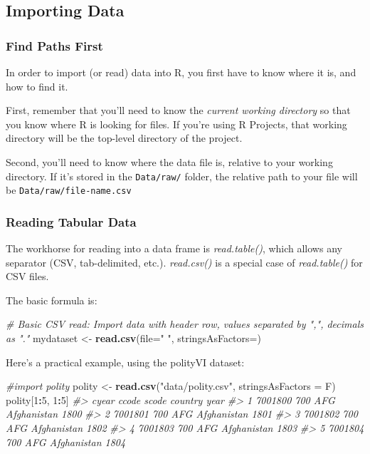 \documentclass[]{book}
\newenvironment{Shaded}{\begin{snugshade}}{\end{snugshade}}
\newcommand{\KeywordTok}[1]{\textcolor[rgb]{0.13,0.29,0.53}{\textbf{#1}}}
\newcommand{\DataTypeTok}[1]{\textcolor[rgb]{0.13,0.29,0.53}{#1}}
\newcommand{\DecValTok}[1]{\textcolor[rgb]{0.00,0.00,0.81}{#1}}
\newcommand{\StringTok}[1]{\textcolor[rgb]{0.31,0.60,0.02}{#1}}
\newcommand{\CommentTok}[1]{\textcolor[rgb]{0.56,0.35,0.01}{\textit{#1}}}
\newcommand{\OperatorTok}[1]{\textcolor[rgb]{0.81,0.36,0.00}{\textbf{#1}}}
\newcommand{\NormalTok}[1]{#1}
\begin{document}
\subsection{Importing Data}\label{importing-data}

\subsubsection*{Find Paths First}\label{find-paths-first}

In order to import (or read) data into R, you first have to know where
it is, and how to find it.

First, remember that you'll need to know the \emph{current working
directory} so that you know where R is looking for files. If you're
using R Projects, that working directory will be the top-level directory
of the project.

Second, you'll need to know where the data file is, relative to your
working directory. If it's stored in the \texttt{Data/raw/} folder, the
relative path to your file will be \texttt{Data/raw/file-name.csv}

\subsubsection*{Reading Tabular Data}\label{reading-tabular-data}

The workhorse for reading into a data frame is \emph{read.table()},
which allows any separator (CSV, tab-delimited, etc.). \emph{read.csv()}
is a special case of \emph{read.table()} for CSV files.

The basic formula is:

\begin{Shaded}
\begin{Highlighting}[]
\CommentTok{# Basic CSV read: Import data with header row, values separated by ",", decimals as "."}
\NormalTok{mydataset <-}\StringTok{ }\KeywordTok{read.csv}\NormalTok{(}\DataTypeTok{file=}\StringTok{"  "}\NormalTok{, }\DataTypeTok{stringsAsFactors=}\NormalTok{)}
\end{Highlighting}
\end{Shaded}

Here's a practical example, using the polityVI dataset:

\begin{Shaded}
\begin{Highlighting}[]
\CommentTok{#import polity}
\NormalTok{polity <-}\StringTok{ }\KeywordTok{read.csv}\NormalTok{(}\StringTok{"data/polity.csv"}\NormalTok{, }\DataTypeTok{stringsAsFactors =}\NormalTok{ F)}
\NormalTok{polity[}\DecValTok{1}\OperatorTok{:}\DecValTok{5}\NormalTok{, }\DecValTok{1}\OperatorTok{:}\DecValTok{5}\NormalTok{]}
\CommentTok{#>     cyear ccode scode     country year}
\CommentTok{#> 1 7001800   700   AFG Afghanistan 1800}
\CommentTok{#> 2 7001801   700   AFG Afghanistan 1801}
\CommentTok{#> 3 7001802   700   AFG Afghanistan 1802}
\CommentTok{#> 4 7001803   700   AFG Afghanistan 1803}
\CommentTok{#> 5 7001804   700   AFG Afghanistan 1804}
\end{Highlighting}
\end{Shaded}
\end{document}
